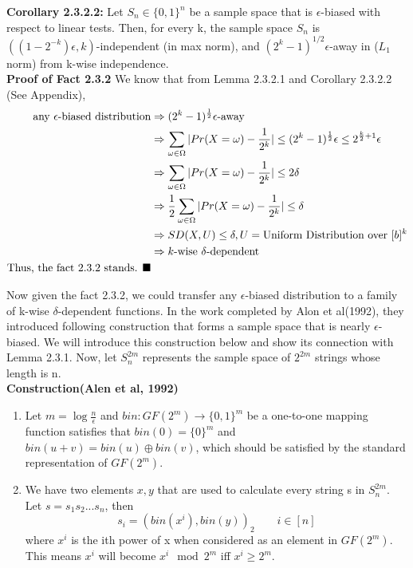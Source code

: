 \documentclass[a4paper, english]{paper}
\begin{document}
	\noindent\textbf{Corollary 2.3.2.2:} Let $S_n \in \{0, 1\}^n$ be a sample space that is $\epsilon$-biased with respect to linear tests. Then, for every k, the sample space $S_n$ is $((1-2^{-k})\epsilon, k)$-independent (in max norm), and $(2^k-1)^{1/2}\epsilon$-away  in ($L_1$ norm) from k-wise independence. \\
	
	\noindent\textbf{Proof of Fact 2.3.2}
	We know that from Lemma 2.3.2.1 and Corollary 2.3.2.2 (See Appendix), 
	\begin{align*}
	\text{any $\epsilon$-biased distribution} &\Rightarrow (2^k-1)^{\frac12}\epsilon\text{-away}\\
	&\Rightarrow \sum_{\omega\in \Omega}| Pr(X = \omega) - \frac1{2^k}|\le (2^k-1)^{\frac12}\epsilon\le2^{\frac k2+1}\epsilon\\
	&\Rightarrow \sum_{\omega\in \Omega}| Pr(X = \omega) - \frac1{2^k}|\le 2\delta\\
	&\Rightarrow \frac12\sum_{\omega\in \Omega}| Pr(X = \omega) - \frac1{2^k}|\le \delta\\
 	&\Rightarrow SD(X,U)\le \delta, U=\text{Uniform Distribution over }[b]^k\\
	&\Rightarrow k\text{-wise }\delta\text{-dependent }\\
	\text{Thus, the fact 2.3.2 stands. $\hfill\blacksquare$}
	\end{align*}\par
 Now given the fact 2.3.2, we could transfer any $\epsilon$-biased distribution to a family of k-wise $\delta$-dependent functions. In the work completed by Alon et al(1992), they introduced following construction that forms a sample space that is nearly $\epsilon$-biased. We will introduce this construction below and show its connection with Lemma 2.3.1. Now, let $S^{2m}_n$ represents the sample space of $2^{2m}$ strings whose length is n.\\

	\noindent\textbf{Construction(Alen et al, 1992)}
	\begin{enumerate}
	\item Let $m=\log\frac n \epsilon$ and $bin: GF(2^m)\rightarrow\{0,1\}^m$ be a one-to-one mapping function satisfies that $bin(0)=\{0\}^m$ and $bin(u+v)=bin(u)\oplus bin(v)$, which should be satisfied by the standard representation of $GF(2^m)$.
	\item We have two elements $x,y$ that are used to calculate every string s in $S^{2m}_n$. Let $s = s_1s_2...s_n$, then $$s_i = (bin(x^i),bin(y))_2\qquad i\in[n]$$ where $x^i$ is the ith power of x when considered as an element in $GF(2^m)$. This means $x^i$ will become $x^i \mod 2^m$ iff $x^i\ge 2^m$.
	\end{enumerate}
\end{document}
